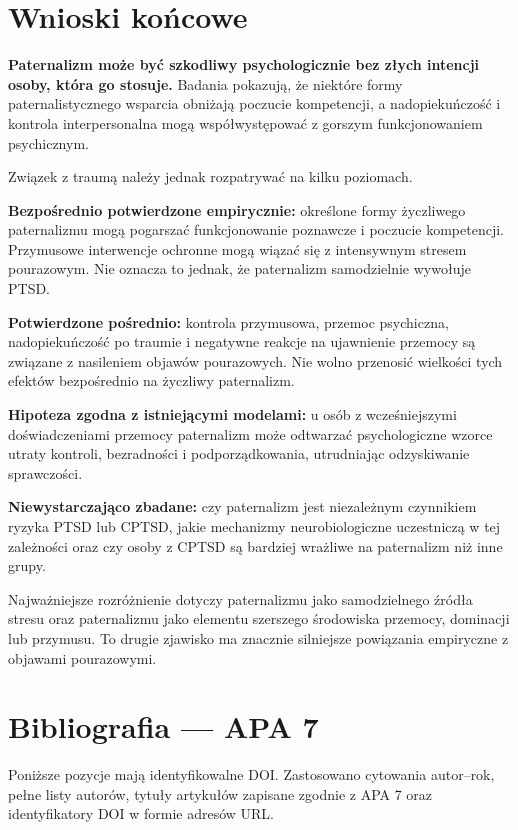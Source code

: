 \documentclass[11pt,a4paper,oneside,headinclude=true,footinclude=false]{scrartcl}
\begin{document}
\section{Wnioski końcowe}\label{sec:11}

\textbf{Paternalizm może być szkodliwy psychologicznie bez złych
intencji osoby, która go stosuje.} Badania pokazują, że niektóre formy
paternalistycznego wsparcia obniżają poczucie kompetencji, a
nadopiekuńczość i kontrola interpersonalna mogą współwystępować z
gorszym funkcjonowaniem psychicznym.

Związek z traumą należy jednak rozpatrywać na kilku poziomach.

\textbf{Bezpośrednio potwierdzone empirycznie:} określone formy
życzliwego paternalizmu mogą pogarszać funkcjonowanie poznawcze i
poczucie kompetencji. Przymusowe interwencje ochronne mogą wiązać się z
intensywnym stresem pourazowym. Nie oznacza to jednak, że paternalizm
samodzielnie wywołuje PTSD.

\textbf{Potwierdzone pośrednio:} kontrola przymusowa, przemoc
psychiczna, nadopiekuńczość po traumie i negatywne reakcje na ujawnienie
przemocy są związane z nasileniem objawów pourazowych. Nie wolno
przenosić wielkości tych efektów bezpośrednio na życzliwy paternalizm.

\textbf{Hipoteza zgodna z istniejącymi modelami:} u osób z
wcześniejszymi doświadczeniami przemocy paternalizm może odtwarzać
psychologiczne wzorce utraty kontroli, bezradności i podporządkowania,
utrudniając odzyskiwanie sprawczości.

\textbf{Niewystarczająco zbadane:} czy paternalizm jest niezależnym
czynnikiem ryzyka PTSD lub CPTSD, jakie mechanizmy neurobiologiczne
uczestniczą w tej zależności oraz czy osoby z CPTSD są bardziej wrażliwe
na paternalizm niż inne grupy.

Najważniejsze rozróżnienie dotyczy paternalizmu jako samodzielnego
źródła stresu oraz paternalizmu jako elementu szerszego środowiska
przemocy, dominacji lub przymusu. To drugie zjawisko ma znacznie
silniejsze powiązania empiryczne z objawami pourazowymi.


\section{Bibliografia --- APA 7}\label{sec:12}

Poniższe pozycje mają identyfikowalne DOI. Zastosowano cytowania
autor--rok, pełne listy autorów, tytuły artykułów zapisane zgodnie z APA
7 oraz identyfikatory DOI w formie adresów URL.
\end{document}
